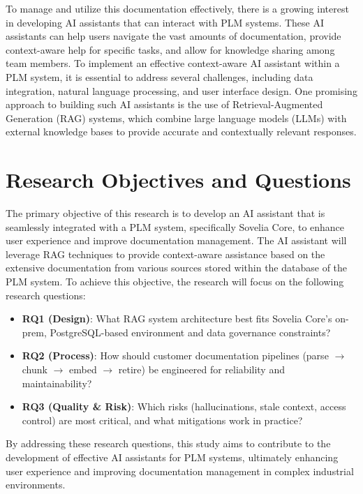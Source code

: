 To manage and utilize this documentation effectively, there is a growing interest in developing AI assistants that can interact with PLM systems. These AI assistants can help users navigate the vast amounts of documentation, provide context-aware help for specific tasks, and allow for knowledge sharing among team members. To implement an effective context-aware AI assistant within a PLM system, it is essential to address several challenges, including data integration, natural language processing, and user interface design. One promising approach to building such AI assistants is the use of Retrieval-Augmented Generation (RAG) systems, which combine large language models (LLMs) with external knowledge bases to provide accurate and contextually relevant responses\parencite{lewis_retrieval-augmented_2021}.

\section{Research Objectives and Questions}
\label{sec:research-objectives-and-questions}

The primary objective of this research is to develop an AI assistant that is seamlessly integrated with a PLM system, specifically Sovelia Core, to enhance user experience and improve documentation management. The AI assistant will leverage RAG techniques to provide context-aware assistance based on the extensive documentation from various sources stored within the database of the PLM system. To achieve this objective, the research will focus on the following research questions:

\begin{itemize}
	\item \textbf{RQ1 (Design)}: What RAG system architecture best fits Sovelia Core's on-prem, PostgreSQL-based environment and data governance constraints?
	\item \textbf{RQ2 (Process)}: How should customer documentation pipelines (parse $ \rightarrow $ chunk $ \rightarrow $ embed $ \rightarrow $ retire) be engineered for reliability and maintainability?
	\item \textbf{RQ3 (Quality \& Risk)}: Which risks (hallucinations, stale context, access control) are most critical, and what mitigations work in practice?
\end{itemize}

By addressing these research questions, this study aims to contribute to the development of effective AI assistants for PLM systems, ultimately enhancing user experience and improving documentation management in complex industrial environments.

